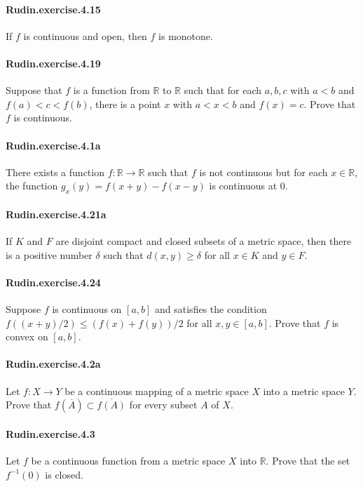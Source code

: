 \documentclass{article}
\begin{document}
\paragraph{Rudin.exercise.4.15} If $f$ is continuous and open, then $f$ is monotone.

\paragraph{Rudin.exercise.4.19} Suppose that $f$ is a function from $\mathbb{R}$ to $\mathbb{R}$ such that for each $a, b, c$ with $a < b$ and $f(a) < c < f(b)$, there is a point $x$ with $a < x < b$ and $f(x) = c$. Prove that $f$ is continuous.

\paragraph{Rudin.exercise.4.1a} There exists a function $f:\mathbb{R}\to\mathbb{R}$ such that $f$ is not continuous but for each $x\in\mathbb{R}$, the function $g_x(y)=f(x+y)-f(x-y)$ is continuous at $0$.

\paragraph{Rudin.exercise.4.21a} If $K$ and $F$ are disjoint compact and closed subsets of a metric space, then there is a positive number $\delta$ such that $d(x,y)\geq \delta$ for all $x\in K$ and $y\in F$.

\paragraph{Rudin.exercise.4.24} Suppose $f$ is continuous on $[a,b]$ and satisfies the condition $f((x+y)/2)\leq (f(x)+f(y))/2$ for all $x,y\in [a,b]$. Prove that $f$ is convex on $[a,b]$.

\paragraph{Rudin.exercise.4.2a} Let $f:X\to Y$ be a continuous mapping of a metric space $X$ into a metric space $Y$. Prove that $f(\overline{A})\subset \overline{f(A)}$ for every subset $A$ of $X$.

\paragraph{Rudin.exercise.4.3} Let $f$ be a continuous function from a metric space $X$ into $\mathbb{R}$. Prove that the set $f^{-1}(0)$ is closed.
\end{document}
